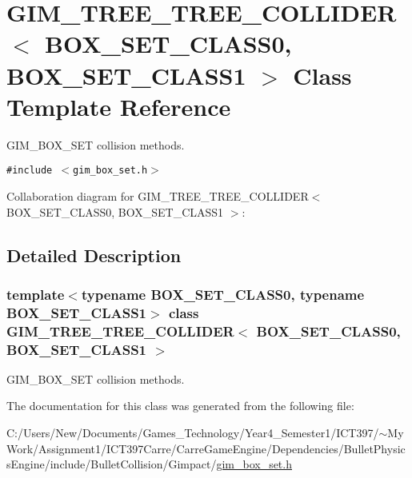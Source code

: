 \hypertarget{class_g_i_m___t_r_e_e___t_r_e_e___c_o_l_l_i_d_e_r}{
\section{GIM\_\-TREE\_\-TREE\_\-COLLIDER$<$ BOX\_\-SET\_\-CLASS0, BOX\_\-SET\_\-CLASS1 $>$ Class Template Reference}
\label{class_g_i_m___t_r_e_e___t_r_e_e___c_o_l_l_i_d_e_r}
}
GIM\_\-BOX\_\-SET collision methods.  


{\tt \#include $<$gim\_\-box\_\-set.h$>$}

Collaboration diagram for GIM\_\-TREE\_\-TREE\_\-COLLIDER$<$ BOX\_\-SET\_\-CLASS0, BOX\_\-SET\_\-CLASS1 $>$:

\subsection{Detailed Description}
\subsubsection*{template$<$typename BOX\_\-SET\_\-CLASS0, typename BOX\_\-SET\_\-CLASS1$>$ class GIM\_\-TREE\_\-TREE\_\-COLLIDER$<$ BOX\_\-SET\_\-CLASS0, BOX\_\-SET\_\-CLASS1 $>$}

GIM\_\-BOX\_\-SET collision methods. 

The documentation for this class was generated from the following file:\begin{CompactItemize}
\item 
C:/Users/New/Documents/Games\_\-Technology/Year4\_\-Semester1/ICT397/$\sim$My Work/Assignment1/ICT397Carre/CarreGameEngine/Dependencies/BulletPhysicsEngine/include/BulletCollision/Gimpact/\hyperlink{gim__box__set_8h}{gim\_\-box\_\-set.h}\end{CompactItemize}
